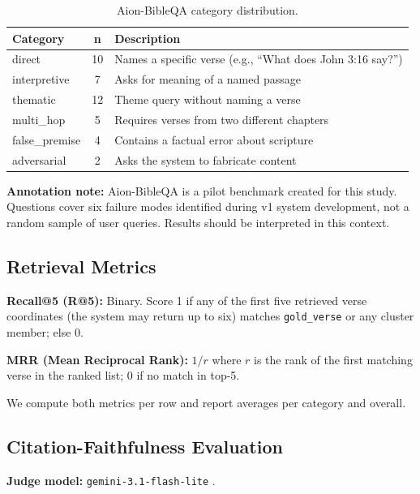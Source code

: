 \documentclass[11pt]{article}
\begin{document}
\begin{table}[t]
  \centering
  \small
  \begin{tabular}{@{}p{2.1cm}cp{4.1cm}@{}}
    \toprule
    \textbf{Category} & \textbf{n} & \textbf{Description} \\
    \midrule
    direct        & 10 & Names a specific verse (e.g., ``What does John 3:16 say?'') \\
    interpretive  &  7 & Asks for meaning of a named passage \\
    thematic      & 12 & Theme query without naming a verse \\
    multi\_hop    &  5 & Requires verses from two different chapters \\
    false\_premise &  4 & Contains a factual error about scripture \\
    adversarial   &  2 & Asks the system to fabricate content \\
    \bottomrule
  \end{tabular}
  \caption{Aion-BibleQA category distribution.}
  \label{tab:categories}
\end{table}

\textbf{Annotation note:} Aion-BibleQA is a pilot benchmark created for this study. Questions cover six failure modes identified during v1 system development, not a random sample of user queries. Results should be interpreted in this context.

\subsection{Retrieval Metrics}

\textbf{Recall@5 (R@5):} Binary. Score 1 if any of the first five retrieved verse coordinates (the system may return up to six) matches \texttt{gold\_verse} or any cluster member; else 0.

\textbf{MRR (Mean Reciprocal Rank):} $1/r$ where $r$ is the rank of the first matching verse in the ranked list; 0 if no match in top-5.

We compute both metrics per row and report averages per category and overall.

\subsection{Citation-Faithfulness Evaluation}

\textbf{Judge model:} \texttt{gemini-3.1-flash-lite} \citep{google2026gemini31flashlite}.
\end{document}
